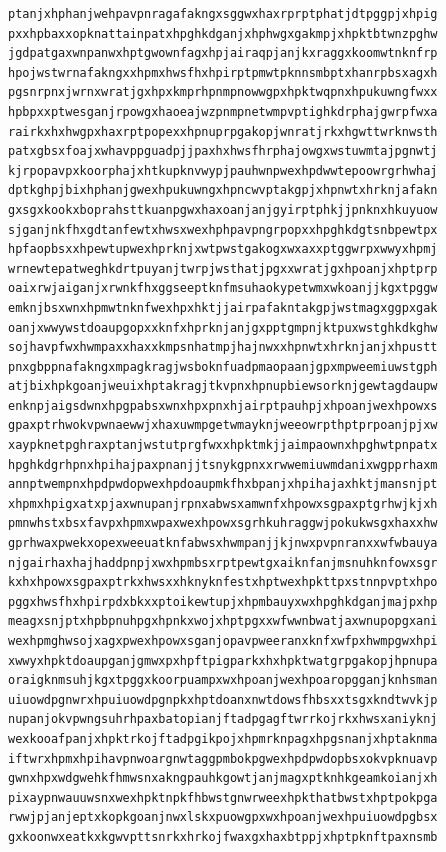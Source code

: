 \documentclass[11pt,letterpaper]{exam}
\begin{document}
\begin{questions}
\begin{verbatim}
ptanjxhphanjwehpavpnragafakngxsggwxhaxrprptphatjdtpggpjxhpig
pxxhpbaxxopknattainpatxhpghkdganjxhphwgxgakmpjxhpktbtwnzpghw
jgdpatgaxwnpanwxhptgwownfagxhpjairaqpjanjkxraggxkoomwtnknfrp
hpojwstwrnafakngxxhpmxhwsfhxhpirptpmwtpknnsmbptxhanrpbsxagxh
pgsnrpnxjwrnxwratjgxhpxkmprhpnmpnowwgpxhpktwqpnxhpukuwngfwxx
hpbpxxptwesganjrpowgxhaoeajwzpnmpnetwmpvptighkdrphajgwrpfwxa
rairkxhxhwgpxhaxrptpopexxhpnuprpgakopjwnratjrkxhgwttwrknwsth
patxgbsxfoajxwhavppguadpjjpaxhxhwsfhrphajowgxwstuwmtajpgnwtj
kjrpopavpxkoorphajxhtkupknvwypjpauhwnpwexhpdwwtepoowrgrhwhaj
dptkghpjbixhphanjgwexhpukuwngxhpncwvptakgpjxhpnwtxhrknjafakn
gxsgxkookxboprahsttkuanpgwxhaxoanjanjgyirptphkjjpnknxhkuyuow
sjganjnkfhxgdtanfewtxhwsxwexhphpavpngrpopxxhpghkdgtsnbpewtpx
hpfaopbsxxhpewtupwexhprknjxwtpwstgakogxwxaxxptggwrpxwwyxhpmj
wrnewtepatweghkdrtpuyanjtwrpjwsthatjpgxxwratjgxhpoanjxhptprp
oaixrwjaiganjxrwnkfhxggseeptknfmsuhaokypetwmxwkoanjjkgxtpggw
emknjbsxwnxhpmwtnknfwexhpxhktjjairpafakntakgpjwstmagxggpxgak
oanjxwwywstdoaupgopxxknfxhprknjanjgxpptgmpnjktpuxwstghkdkghw
sojhavpfwxhwmpaxxhaxxkmpsnhatmpjhajnwxxhpnwtxhrknjanjxhpustt
pnxgbppnafakngxmpagkragjwsboknfuadpmaopaanjgpxmpweemiuwstgph
atjbixhpkgoanjweuixhptakragjtkvpnxhpnupbiewsorknjgewtagdaupw
enknpjaigsdwnxhpgpabsxwnxhpxpnxhjairptpauhpjxhpoanjwexhpowxs
gpaxptrhwokvpwnaewwjxhaxuwmpgetwmayknjweeowrpthptprpoanjpjxw
xaypknetpghraxptanjwstutprgfwxxhpktmkjjaimpaownxhpghwtpnpatx
hpghkdgrhpnxhpihajpaxpnanjjtsnykgpnxxrwwemiuwmdanixwgpprhaxm
annptwempnxhpdpwdopwexhpdoaupmkfhxbpanjxhpihajaxhktjmansnjpt
xhpmxhpigxatxpjaxwnupanjrpnxabwsxamwnfxhpowxsgpaxptgrhwjkjxh
pmnwhstxbsxfavpxhpmxwpaxwexhpowxsgrhkuhraggwjpokukwsgxhaxxhw
gprhwaxpwekxopexweeuatknfabwsxhwmpanjjkjnwxpvpnranxxwfwbauya
njgairhaxhajhaddpnpjxwxhpmbsxrptpewtgxaiknfanjmsnuhknfowxsgr
kxhxhpowxsgpaxptrkxhwsxxhknyknfestxhptwexhpkttpxstnnpvptxhpo
pggxhwsfhxhpirpdxbkxxptoikewtupjxhpmbauyxwxhpghkdganjmajpxhp
meagxsnjptxhpbpnuhpgxhpnkxwojxhptpgxxwfwwnbwatjaxwnupopgxani
wexhpmghwsojxagxpwexhpowxsganjopavpweeranxknfxwfpxhwmpgwxhpi
xwwyxhpktdoaupganjgmwxpxhpftpigparkxhxhpktwatgrpgakopjhpnupa
oraigknmsuhjkgxtpggxkoorpuampxwxhpoanjwexhpoaropgganjknhsman
uiuowdpgnwrxhpuiuowdpgnpkxhptdoanxnwtdowsfhbsxxtsgxkndtwvkjp
nupanjokvpwngsuhrhpaxbatopianjftadpgagftwrrkojrkxhwsxaniyknj
wexkooafpanjxhpktrkojftadpgikpojxhpmrknpagxhpgsnanjxhptaknma
iftwrxhpmxhpihavpnwoargnwtaggpmbokpgwexhpdpwdopbsxokvpknuavp
gwnxhpxwdgwehkfhmwsnxakngpauhkgowtjanjmagxptknhkgeamkoianjxh
pixaypnwauuwsnxwexhpktnpkfhbwstgnwrweexhpkthatbwstxhptpokpga
rwwjpjanjeptxkopkgoanjnwxlskxpuowgpxwxhpoanjwexhpuiuowdpgbsx
gxkoonwxeatkxkgwvpttsnrkxhrkojfwaxgxhaxbtppjxhptpknftpaxnsmb

\end{verbatim}
\end{questions}
\end{document}
